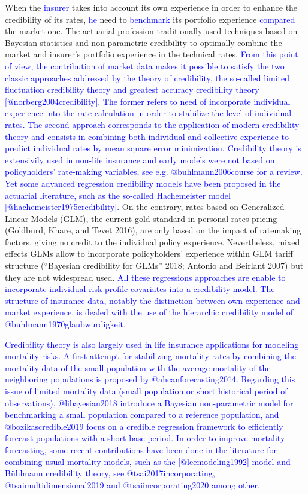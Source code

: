 \documentclass[
]{article}
\begin{document}
When the \textcolor{blue}{insurer} takes into account its own experience
in order to enhance the credibility of its rates, \textcolor{blue}{he}
need to \textcolor{blue}{benchmark} its portfolio experience
\textcolor{blue}{compared} the market one. The actuarial profession
traditionally used techniques based on Bayesian statistics and
non-parametric credibility to optimally combine the market and insurer's
portfolio experience in the technical rates.
\textcolor{blue}{From this point of view, the contribution of market data makes it possible to satisfy the two classic approaches addressed by the theory of credibility, the so-called limited fluctuation credibility theory and greatest accuracy credibility theory [@norberg2004credibility]. The former refers to need of incorporate individual experience into the rate calculation in order to stabilize the level of individual rates. The second approach corresponds to the application of modern credibility theory and consists in combining both individual and collective experience to predict individual rates by mean square error minimization. Credibility theory is extensivily used in non-life insurance and early models were not based on policyholders’ rate-making variables, see e.g. @buhlmann2006course for a review. Yet some advanced regression credibility models have been proposed in the actuarial literature, such as the so-called Hachemeister model [@hachemeister1975credibility].}
On the contrary, rates based on Generalized Linear Models (GLM), the
current gold standard in personal rates pricing (Goldburd, Khare, and
Tevet 2016), are only based on the impact of ratemaking factors, giving
no credit to the individual policy experience. Nevertheless, mixed
effects GLMs allow to incorporate policyholders' experience within GLM
tariff structure ({``{Bayesian credibility for GLMs}''} 2018; Antonio
and Beirlant 2007) but they are not widespread used.
\textcolor{blue}{All these regressions approaches are enable to incorporate individual risk profile covariates into a credibility model. The structure of insurance data, notably the distinction between own experience and market experience, is dealed with the use of the hierarchic credibility model of @buhlmann1970glaubwurdigkeit.}

\textcolor{blue}{Credibility theory is also largely used in life insurance applications for modeling mortality risks. A first attempt for stabilizing mortality rates by combining the mortality data of the small population with the average mortality of the neighboring populations is proposed by @ahcanforecasting2014. Regarding this issue of limited mortality data (small population or short historical period of observations), @libayesian2018 introduce a Bayesian non-parametric model for benchmarking a small population compared to a reference population, and @bozikascredible2019 focus on a credible regression framework to efficiently forecast populations with a short-base-period. In order to improve mortality forecasting, some recent contributions have been done in the literature for combining usual mortality models, such as the [@leemodeling1992] model and Bühlmann credibility theory, see @tsai2017incorporating, @tsaimultidimensional2019 and @tsaiincorporating2020 among other.}
\end{document}
